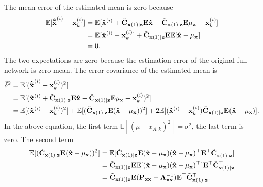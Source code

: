 The mean error of the estimated mean is zero because
\begin{equation}
\begin{split}
\mathbb{E}[{\bf{\hat{\tilde x}}}^{(i)}-{\bf x}^{(i)}_{k}]&=\mathbb{E}[{\bf{\hat{x}}}^{(i)}+\tilde{\bf C}_{{\bf x}(1)|{\bf z}}{\bf E}{\bf{\hat{x}}}-\tilde{\bf C}_{{\bf x}(1)|{\bf z}}{\bf E}\mu_{\bf x}-{\bf x}^{(i)}_{k}] \\
&=\mathbb{E}[{\bf{\hat{x}}}^{(i)}-{\bf x}^{(i)}_{k}]+\tilde{\bf C}_{{\bf x}(1)|{\bf z}}{\bf E}\mathbb{E}[{\bf{\hat{x}}}-\mu_{\bf x}] \\
&=0.
\end{split}
\end{equation}
The two expectations are zero because the estimation error of the original full network is zero-mean. The error covariance of the estimated mean is
\begin{equation}
\begin{split}
\tilde\delta^2&=\mathbb{E}[({\bf{\hat{\tilde x}}}^{(i)}-{\bf x}^{(i)}_{k})^2] \\
&=\mathbb{E}[({\bf{\hat{ x}}}^{(i)}+\tilde{\bf C}_{{\bf x}(1)|{\bf z}}{\bf E}{\bf{\hat{x}}}-\tilde{\bf C}_{{\bf x}(1)|{\bf z}}{\bf E}\mu_{\bf x}-{\bf x}^{(i)}_{k})^2] \\
&=\mathbb{E}[({\bf{\hat{ x}}}^{(i)}-{\bf x}^{(i)}_{k})^2]+\mathbb{E}[(\tilde{\bf C}_{{\bf x}(1)|{\bf z}}{\bf E}({\bf{\hat{x}}}-\mu_{\bf x}))^2]+2\mathbb{E}[({\bf{\hat{ x}}}^{(i)}-{\bf x}^{(i)}_{k})\tilde{\bf C}_{{\bf x}(1)|{\bf z}}{\bf E}({\bf{\hat{x}}}-\mu_{\bf x})]. \\
\end{split}
\end{equation}
In the above equation, the first term $\mathbb{E}[(\mu-x_{A,k})^2]=\sigma^2$, the last term is zero. %
The second term
\begin{equation}
\begin{split}
\mathbb{E}[(\tilde{\bf C}_{{\bf x}(1)|{\bf z}}{\bf E}({\bf{\hat{x}}}-\mu_{\bf x}))^2]
&=\mathbb{E}[\tilde{\bf C}_{{\bf x}(1)|{\bf z}}{\bf E}({\bf{\hat{x}}}-\mu_{\bf x})({\bf{\hat{x}}}-\mu_{\bf x})^\top{\bf E}^\top\tilde{\bf C}_{{\bf x}(1)|{\bf z}}^\top] \\
&=\tilde{\bf C}_{{\bf x}(1)|{\bf z}}{\bf E}\mathbb{E}[({\bf{\hat{x}}}-\mu_{\bf x})({\bf{\hat{x}}}-\mu_{\bf x})^\top]{\bf E}^\top\tilde{\bf C}_{{\bf x}(1)|{\bf z}}^\top \\
&=\tilde{\bf C}_{{\bf x}(1)|{\bf z}}{\bf E}({\bf P}_{\bf xx}-{\bf \Lambda}_{\bf xx}^{-1}){\bf E}^\top\tilde{\bf C}_{{\bf x}(1)|{\bf z}}^\top. \\
\end{split}
\end{equation}
